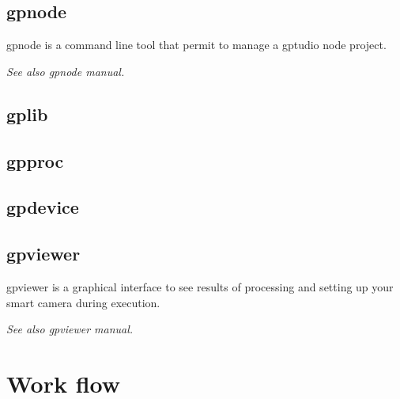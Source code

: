 \subsection{gpnode}
gpnode is a command line tool that permit to manage a gptudio node project.

\emph{See also gpnode manual.}

\subsection{gplib}

\subsection{gpproc}

\subsection{gpdevice}

\subsection{gpviewer}
gpviewer is a graphical interface to see results of processing and setting up your smart camera during execution.

\emph{See also gpviewer manual.}

\section{Work flow}

